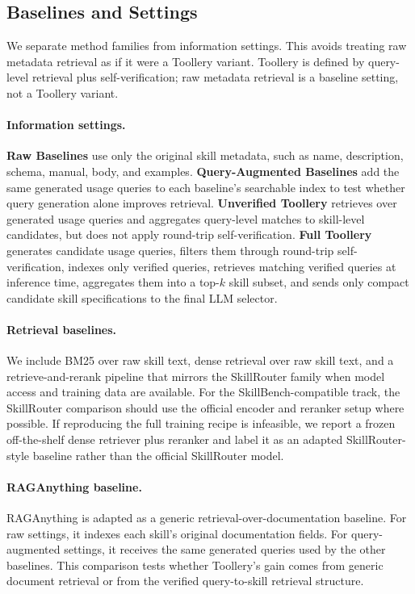 \subsection{Baselines and Settings}
\label{subsec:baselines}

We separate method families from information settings. This avoids treating raw
metadata retrieval as if it were a Toollery variant. Toollery is defined by query-level
retrieval plus self-verification; raw metadata retrieval is a baseline setting,
not a Toollery variant.

\paragraph{Information settings.}
\textbf{Raw Baselines} use only the original skill metadata, such as name,
description, schema, manual, body, and examples. \textbf{Query-Augmented
Baselines} add the same generated usage queries to each baseline's searchable
index to test whether query generation alone improves retrieval. \textbf{
Unverified Toollery} retrieves over generated usage queries and aggregates
query-level matches to skill-level candidates, but does not apply round-trip
self-verification. \textbf{Full Toollery} generates candidate usage queries,
filters them through round-trip self-verification, indexes only verified queries,
retrieves matching verified queries at inference time, aggregates them into a
top-$k$ skill subset, and sends only compact candidate skill specifications to
the final LLM selector.

\paragraph{Retrieval baselines.}
We include BM25 over raw skill text, dense retrieval over raw skill text, and a
retrieve-and-rerank pipeline that mirrors the SkillRouter family when model
access and training data are available. For the SkillBench-compatible track, the
SkillRouter comparison should use the official encoder and reranker setup where
possible. If reproducing the full training recipe is infeasible, we report a
frozen off-the-shelf dense retriever plus reranker and label it as an adapted
SkillRouter-style baseline rather than the official SkillRouter model.

\paragraph{RAGAnything baseline.}
RAGAnything is adapted as a generic retrieval-over-documentation baseline. For
raw settings, it indexes each skill's original documentation fields. For
query-augmented settings, it receives the same generated queries used by the
other baselines. This comparison tests whether Toollery's gain comes from
generic document retrieval or from the verified query-to-skill retrieval
structure.

